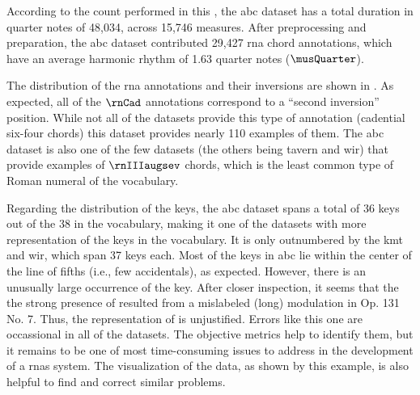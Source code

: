 
According to the count performed in this \thesisdiss{}, the
\gls{abc} dataset has a total duration in quarter notes of
48,034, across 15,746 measures. After preprocessing and
preparation, the \gls{abc} dataset contributed 29,427
\gls{rna} chord annotations, which have an average harmonic
rhythm of 1.63 quarter notes ($\musQuarter$).

The distribution of the \gls{rna} annotations and their
inversions are shown in . As
expected, all of the $\rnCad$ annotations correspond to a
``second inversion'' position. While not all of the datasets
provide this type of annotation (cadential six-four chords)
this dataset provides nearly 110 examples of them. The
\gls{abc} dataset is also one of the few datasets (the
others being \gls{tavern} and \gls{wir}) that provide
examples of $\rnIIIaugsev$ chords, which is the least common
type of Roman numeral of the vocabulary.


Regarding the distribution of the keys, the \gls{abc}
dataset spans a total of 36 keys out of the 38 in the
vocabulary, making it one of the datasets with more
representation of the keys in the vocabulary. It is only
outnumbered by the \gls{kmt} and \gls{wir}, which span 37
keys each. Most of the keys in \gls{abc} lie within the
center of the line of fifths (i.e., few accidentals), as
expected. However, there is an unusually large occurrence of
the \keyDs{} key. After closer inspection, it seems that the
the strong presence of \keyDs{} resulted from a mislabeled
(long) modulation in Op. 131 No. 7. Thus, the representation
of \keyDs{} is unjustified. Errors like this one are
occassional in all of the datasets. The objective metrics
help to identify them, but it remains to be one of most
time-consuming issues to address in the development of a
\glspl{rna} system. The visualization of the data, as shown
by this example, is also helpful to find and correct similar
problems.


